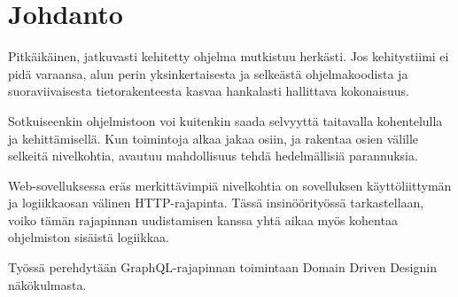 
\chapter{Johdanto}

Pitkäikäinen, jatkuvasti kehitetty ohjelma mutkistuu herkästi. Jos kehitystiimi
ei pidä varaansa, alun perin yksinkertaisesta ja selkeästä ohjelmakoodista ja suoraviivaisesta tietorakenteesta kasvaa hankalasti hallittava kokonaisuus.

Sotkuiseenkin ohjelmistoon voi kuitenkin saada selvyyttä taitavalla kohentelulla
ja kehittämisellä. Kun toimintoja alkaa jakaa osiin, ja rakentaa osien välille
selkeitä nivelkohtia, avautuu mahdollisuus tehdä hedelmällisiä parannuksia.

Web-sovelluksessa eräs merkittävimpiä nivelkohtia on sovelluksen käyttöliittymän
ja logiikkaosan välinen HTTP-rajapinta. Tässä insinöörityössä tarkastellaan,
voiko tämän rajapinnan uudistamisen kanssa yhtä aikaa myös kohentaa ohjelmiston sisäistä logiikkaa.

Työssä perehdytään GraphQL-rajapinnan toimintaan Domain Driven Designin näkökulmasta.
